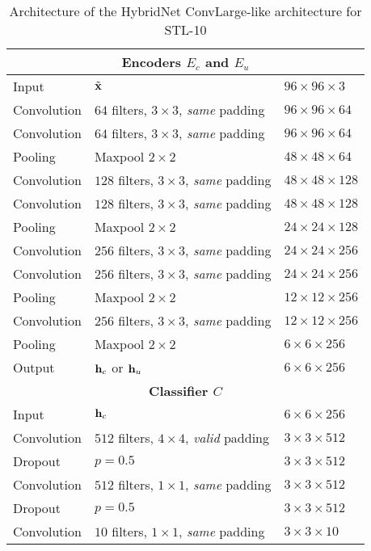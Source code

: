 \documentclass[runningheads]{llncs}
\begin{document}
 \begin{table}[htbp]
\centering
\caption{Architecture of the HybridNet ConvLarge-like architecture for STL-10}
\label{tab:convlargestl}
\begin{threeparttable}
\setlength{\tabcolsep}{4pt}
\begin{tabular}{ l l l}
\toprule
\multicolumn{3}{c}{\textbf{Encoders $E_c$ and $E_u$}} \\
\midrule
Input & $\tilde{\mathbf{x}}$ & $96\times 96\times 3$ \\
Convolution & $64$ filters, $3\times3$, \textit{same} padding & $96\times 96\times 64$ \\
Convolution & $64$ filters, $3\times3$, \textit{same} padding & $96\times 96\times 64$ \\
Pooling   & Maxpool $2\times2$ & $48\times 48\times 64$ \\

Convolution & $128$ filters, $3\times3$, \textit{same} padding & $48\times 48\times 128$ \\
Convolution & $128$ filters, $3\times3$, \textit{same} padding & $48\times 48\times 128$ \\
Pooling   & Maxpool $2\times2$ & $24\times 24\times 128$ \\

Convolution & $256$ filters, $3\times3$, \textit{same} padding  & $24\times 24\times 256$ \\
Convolution & $256$ filters, $3\times3$, \textit{same} padding  & $24\times 24\times 256$ \\
Pooling   & Maxpool $2\times2$ & $12\times 12\times 256$ \\

Convolution & $256$ filters, $3\times3$, \textit{same} padding  & $12\times 12\times 256$ \\
Pooling & Maxpool $2\times2$  & $6\times 6\times 256$ \\

Output & $\mathbf{h}_c$ or $\mathbf{h}_u$ & $6\times 6\times 256$ \\

\toprule
\multicolumn{3}{c}{\textbf{Classifier $C$}}\\
\midrule
Input & $\mathbf{h}_c$& $6\times 6\times 256$ \\

Convolution & $512$ filters, $4\times4$, \textit{valid} padding  & $3\times 3\times 512$ \\
Dropout & $p=0.5$  & $3\times 3\times 512$ \\
Convolution & $512$ filters, $1\times1$, \textit{same} padding & $3\times 3\times 512$ \\
Dropout & $p=0.5$  & $3\times 3\times 512$ \\
Convolution & $10$ filters, $1\times1$, \textit{same} padding & $3\times 3\times 10$ \\


\end{tabular}
\end{threeparttable}
\end{table}
\end{document}

